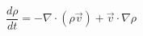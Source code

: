\documentclass[12pt]{article}
\begin{document}
$$
   \frac{d\rho}{dt} = - \nabla \cdot \left( \rho \vec{v} \right) + \vec{v} \cdot \nabla \rho
$$
\end{document}
